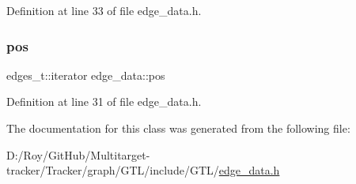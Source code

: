 Definition at line 33 of file edge\+\_\+data.\+h.

\mbox{\label{classedge__data_a178a8fd40a6ec8139291f96a7807f711}} 
\subsubsection{\texorpdfstring{pos}{pos}}
{\footnotesize\ttfamily edges\+\_\+t\+::iterator edge\+\_\+data\+::pos}



Definition at line 31 of file edge\+\_\+data.\+h.



The documentation for this class was generated from the following file\+:\begin{DoxyCompactItemize}
\item 
D\+:/\+Roy/\+Git\+Hub/\+Multitarget-\/tracker/\+Tracker/graph/\+G\+T\+L/include/\+G\+T\+L/\mbox{\hyperlink{edge__data_8h}{edge\+\_\+data.\+h}}\end{DoxyCompactItemize}
